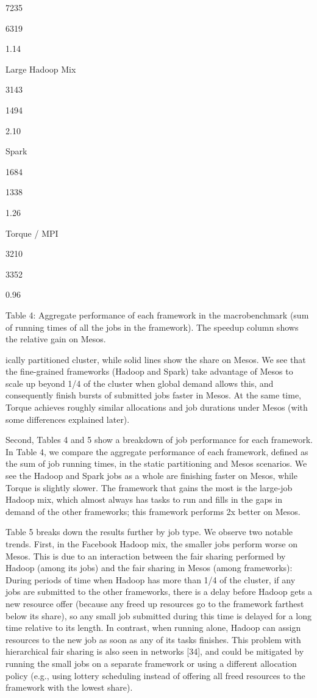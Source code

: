 \documentclass[
]{article}
\begin{document}
7235

6319

1.14

Large Hadoop Mix

3143

1494

2.10

Spark

1684

1338

1.26

Torque / MPI

3210

3352

0.96

Table 4: Aggregate performance of each framework in the macrobenchmark
(sum of running times of all the jobs in the framework). The speedup
column shows the relative gain on Mesos.

ically partitioned cluster, while solid lines show the share on Mesos.
We see that the fine-grained frameworks (Hadoop and Spark) take
advantage of Mesos to scale up beyond 1/4 of the cluster when global
demand allows this, and consequently finish bursts of submitted jobs
faster in Mesos. At the same time, Torque achieves roughly similar
allocations and job durations under Mesos (with some differences
explained later).

Second, Tables 4 and 5 show a breakdown of job performance for each
framework. In Table 4, we compare the aggregate performance of each
framework, defined as the sum of job running times, in the static
partitioning and Mesos scenarios. We see the Hadoop and Spark jobs as a
whole are finishing faster on Mesos, while Torque is slightly slower.
The framework that gains the most is the large-job Hadoop mix, which
almost always has tasks to run and fills in the gaps in demand of the
other frameworks; this framework performs 2x better on Mesos.

Table 5 breaks down the results further by job type. We observe two
notable trends. First, in the Facebook Hadoop mix, the smaller jobs
perform worse on Mesos. This is due to an interaction between the fair
sharing performed by Hadoop (among its jobs) and the fair sharing in
Mesos (among frameworks): During periods of time when Hadoop has more
than 1/4 of the cluster, if any jobs are submitted to the other
frameworks, there is a delay before Hadoop gets a new resource offer
(because any freed up resources go to the framework farthest below its
share), so any small job submitted during this time is delayed for a
long time relative to its length. In contrast, when running alone,
Hadoop can assign resources to the new job as soon as any of its tasks
finishes. This problem with hierarchical fair sharing is also seen in
networks {[}34{]}, and could be mitigated by running the small jobs on a
separate framework or using a different allocation policy (e.g., using
lottery scheduling instead of offering all freed resources to the
framework with the lowest share).
\end{document}

